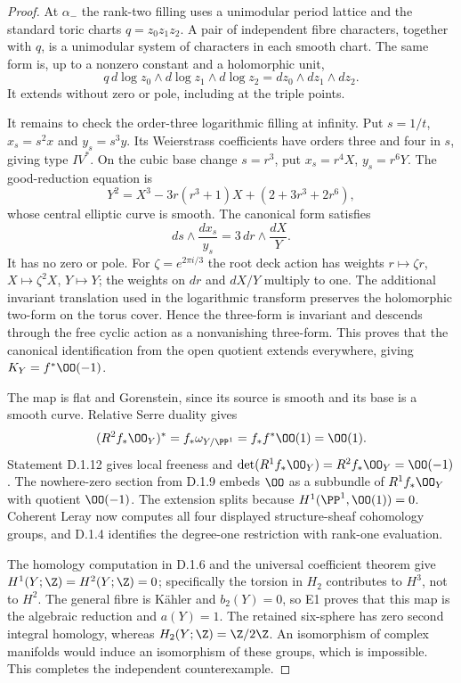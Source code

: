 \begin{proof}
At $\alpha_-$ the rank-two filling uses a unimodular period lattice
and the standard toric charts $q=z_0z_1z_2$. A pair of independent
fibre characters, together with $q$, is a unimodular system of
characters in each smooth chart. The same form is, up to a nonzero
constant and a holomorphic unit,
\[
q\,d\log z_0\wedge d\log z_1\wedge d\log z_2
=dz_0\wedge dz_1\wedge dz_2.
\]
It extends without zero or pole, including at the triple points.

It remains to check the order-three logarithmic filling at infinity.
Put $s=1/t$, $x_s=s^2x$ and $y_s=s^3y$. Its Weierstrass
coefficients have orders three and four in $s$, giving type $IV^*$.
On the cubic base change $s=r^3$, put
$x_s=r^4X$, $y_s=r^6Y$. The good-reduction equation is
\[
Y^2=X^3-3r(r^3+1)X+(2+3r^3+2r^6),
\]
whose central elliptic curve is smooth. The canonical form satisfies
\[
ds\wedge\frac{dx_s}{y_s}
=3\,dr\wedge\frac{dX}{Y}.
\]
It has no zero or pole. For $\zeta=e^{2\pi i/3}$ the root deck
action has weights $r\mapsto\zeta r$, $X\mapsto\zeta^2X$,
$Y\mapsto Y$; the weights on $dr$ and $dX/Y$ multiply to one.
The additional invariant translation used in the logarithmic
transform preserves the holomorphic two-form on the torus cover.
Hence the three-form is invariant and descends through the free
cyclic action as a nonvanishing three-form. This proves that the
canonical identification from the open quotient extends everywhere,
giving $K_Y=f^*\OO(-1)$.

The map is flat and Gorenstein, since its source is smooth and its
base is a smooth curve. Relative Serre duality gives
\[
(R^2f_*\OO_Y)^*=f_*\omega_{Y/\PP^1}
=f_*f^*\OO(1)=\OO(1).
\]
Statement D.1.12 gives local freeness and
$\det(R^1f_*\OO_Y)=R^2f_*\OO_Y=\OO(-1)$.
The nowhere-zero section from D.1.9 embeds $\OO$ as a subbundle
of $R^1f_*\OO_Y$ with quotient $\OO(-1)$. The extension splits
because $H^1(\PP^1,\OO(1))=0$. Coherent Leray now computes all
four displayed structure-sheaf cohomology groups, and D.1.4
identifies the degree-one restriction with rank-one evaluation.

The homology computation in D.1.6 and the universal coefficient
theorem give $H^1(Y;\Z)=H^2(Y;\Z)=0$; specifically the torsion
in $H_2$ contributes to $H^3$, not to $H^2$.
The general fibre is K\"ahler and $b_2(Y)=0$, so E1 proves that
this map is the algebraic reduction and $a(Y)=1$.
The retained six-sphere has zero second integral homology, whereas
$H_2(Y;\Z)=\Z/2\Z$. An isomorphism of complex manifolds would
induce an isomorphism of these groups, which is impossible.
This completes the independent counterexample.
\end{proof}


